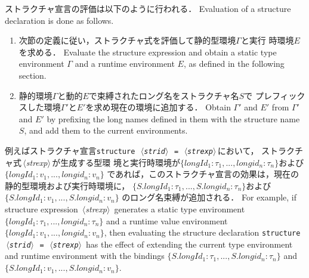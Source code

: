\documentclass{jbook}
\newcommand{\code}[1]{\mbox{\large\tt #1}}
\newcommand{\nonterm}[1]{\mbox{$\,\langle$}{\it #1}\mbox{$\rangle\,$}}
\newcommand{\ass}{\Gamma}
\begin{document}
\ifjp%
	ストラクチャ宣言の評価は以下のように行われる．
\else%
	Evaluation of a structure declaration is done as follows.
\fi%
\begin{enumerate}
\item 
\ifjp%
	次節の定義に従い，ストラクチャ式を評価して静的型環境$\ass$と実行
時環境$E$を求める．
\else%
	Evaluate the structure expression and obtain a static type
environment $\ass$ and a runtime environment $E$, as defined in the
following section. 
\fi%
\item 
\ifjp%
	静的環境$\ass$と動的$E$で束縛されたロング名をストラクチャ名$S$で
プレフィックスした環境$\ass'$と$E'$を求め現在の環境に追加する． 
\else%
	Obtain $\ass'$ and $E'$ from $\ass'$ and $E'$ by prefixing the
long names defined in them with the structure name $S$, and add them to
the current environments.
\fi%
\end{enumerate}
\ifjp%
	例えばストラクチャ宣言\code{structure \nonterm{strid} =
\nonterm{strexp}}において， ストラクチャ式\nonterm{strexp}が生成する型環
境と実行時環境が$\{longId_1:\tau_1,...,longid_n:\tau_n\}$および
$\{longId_1:v_1,...,longid_n:v_n\}$
であれば，このストラクチャ宣言の効果は，現在の静的型環境および実行時環境に，
$\{S.longId_1:\tau_1,..., S.longid_n:\tau_n\}$および
$\{S.longId_1:v_1,..., S.longid_n:v_n\}$
のロング名束縛が追加される．
\else%
	For example, if structure expression \nonterm{strexp} generates 
a static type environment $\{longId_1:\tau_1,...,longid_n:\tau_n\}$
and a runtime value environment $\{longId_1:v_1,...,longid_n:v_n\}$, then
evaluating the structure declaration \code{structure \nonterm{strid} =
\nonterm{strexp}} has the effect of extending the current type
environment and runtime environment with the bindings
$\{S.longId_1:\tau_1,..., S.longid_n:\tau_n\}$ and 
$\{S.longId_1:v_1,..., S.longid_n:v_n\}$.
\fi%
\end{document}
